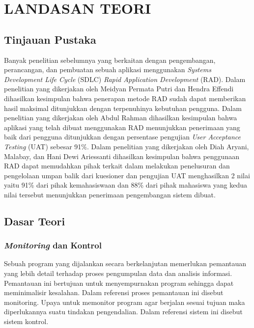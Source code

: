 \chapter{LANDASAN TEORI}

%
\vspace{4.5pt}

\begin{flushleft}
    \begin{justify}
        \section{Tinjauan Pustaka}
    Banyak penelitian sebelumnya yang berkaitan dengan pengembangan, perancangan, dan pembuatan sebuah aplikasi menggunakan
    \textit{Systems Development Life Cycle} (SDLC) \textit{Rapid Application Development} (RAD). Dalam penelitian yang dikerjakan oleh
    Meidyan Permata Putri dan Hendra Effendi \cite{web waterfall} dihasilkan kesimpulan bahwa penerapan metode 
    RAD sudah dapat memberikan hasil maksimal ditunjukkan dengan terpenuhinya kebutuhan pengguna. Dalam penelitian yang dikerjakan oleh Abdul Rahman \cite{jurnal RAD UAT} dihasilkan kesimpulan bahwa 
    aplikasi yang telah dibuat menggunakan RAD menunjukkan penerimaan yang baik dari pengguna ditunjukkan dengan persentase pengujian \emph{User Acceptance Testing} (UAT) sebesar 91\%.
    Dalam penelitian yang dikerjakan oleh Diah Aryani, Malabay, dan Hani Dewi Ariessanti \cite{jurnal RAD UAT 2} dihasilkan kesimpulan bahwa penggunaan RAD dapat memudahkan pihak terkait dalam melakukan penelusuran dan pengelolaan umpan balik dari kuesioner dan
    pengujian UAT menghasilkan 2 nilai yaitu 91\% dari pihak kemahasiswaan dan 88\% dari pihak mahasiswa yang kedua nilai tersebut menunjukkan penerimaan pengembangan sistem dibuat.

    \vspace{1cm}
    \section{Dasar Teori}

        \subsection{\textit{Monitoring} dan Kontrol}
        Sebuah program yang dijalankan secara berkelanjutan memerlukan pemantauan 
        yang lebih detail terhadap proses pengumpulan data dan analisis informasi. 
        Pemantauan ini bertujuan untuk menyempurnakan program sehingga dapat meminimalisir 
        kesalahan. Dalam referensi \cite{Monitoring} proses pemantauan ini disebut monitoring. 
        Upaya untuk memonitor program agar berjalan sesuai tujuan maka diperlukannya suatu 
        tindakan pengendalian. Dalam referensi \cite{Kontrol} sistem ini disebut sistem kontrol. 
        \\

\end{justify}
\end{flushleft}
